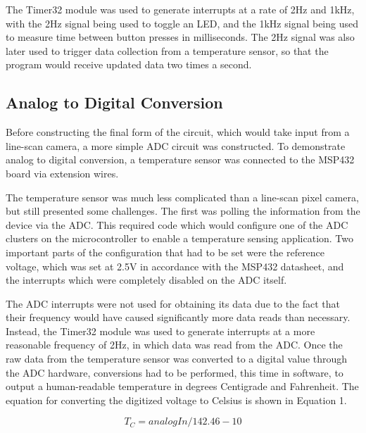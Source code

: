 \documentclass[conference]{IEEEtran}
\begin{document}
The Timer32 module was used to generate interrupts at a rate of 2Hz and
1kHz, with the 2Hz signal being used to toggle an LED, and the 1kHz signal
being used to measure time between button presses in milliseconds. The 2Hz
signal was also later used to trigger data collection from a temperature sensor,
so that the program would receive updated data two times a second.


\subsection{Analog to Digital Conversion}
Before constructing the final form of the circuit, which would take input from
a line-scan camera, a more simple ADC circuit was constructed. To demonstrate
analog to digital conversion, a temperature sensor was connected to the
MSP432 board via extension wires.

The temperature sensor was much less complicated than a line-scan pixel camera,
but still presented some challenges. The first was polling the information
from the device via the ADC. This required code which would configure one of
the ADC clusters on the microcontroller to enable a temperature sensing
application. Two important parts of the configuration that had to be set were the
reference voltage, which was set at 2.5V in accordance with the
MSP432 datasheet, and the interrupts which were completely disabled on the ADC
itself.

The ADC interrupts were not used for obtaining its data due to the fact that
their frequency would have caused significantly more data reads than
necessary. Instead, the Timer32 module was used to generate interrupts at
a more reasonable frequency of 2Hz, in which data was read from the ADC.
Once the raw data from the temperature sensor was converted to a digital value
through the ADC hardware, conversions had to be performed, this time in
software, to output a human-readable temperature in degrees Centigrade and
Fahrenheit. The equation for converting the digitized voltage to Celsius
is shown in Equation 1.

\begin{equation}
    T_C = analogIn / 142.46 - 10
\end{equation}
\end{document}
